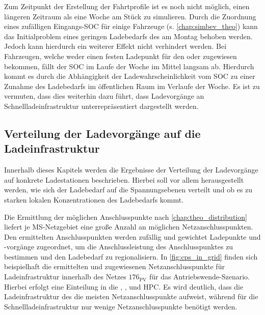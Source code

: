 

Zum Zeitpunkt der Erstellung der Fahrtprofile ist es noch nicht möglich, einen längeren Zeitraum als eine Woche am Stück zu simulieren.
Durch die Zuordnung eines zufälligen Eingangs-\gls{SOC} für einige Fahrzeuge (s. \autoref{chap:simbev_theo}) kann das Initialproblem eines geringen Ladebedarfs des \UC \Firmeparkplatz am Montag behoben werden.
Jedoch kann hierdurch ein weiterer Effekt nicht verhindert werden.
Bei Fahrzeugen, welche weder einen festen Ladepunkt für den \UC \zH oder \Firmeparkplatz zugewiesen bekommen, fällt der \gls{SOC} im Laufe der Woche im Mittel langsam ab.
Hierdurch kommt es durch die Abhängigkeit der Ladewahrscheinlichkeit vom \gls{SOC} zu einer Zunahme des Ladebedarfs im öffentlichen Raum im Verlaufe der Woche.
Es ist zu vermuten, dass dies weiterhin dazu führt, dass Ladevorgänge an Schnellladeinfrastruktur un­ter­re­prä­sen­tiert dargestellt werden.


\subsection{Verteilung der Ladevorgänge auf die Ladeinfrastruktur}\label{chap:distribute_demand_ev}

Innerhalb dieses Kapitels werden die Ergebnisse der Verteilung der Ladevorgänge auf konkrete Ladestationen beschrieben.
Hierbei soll vor allem herausgestellt werden, wie sich der Ladebedarf auf die Spannungsebenen verteilt und ob es zu starken lokalen Konzentrationen des Ladebedarfs kommt.\medskip

Die Ermittlung der möglichen Anschlusspunkte nach \autoref{chap:theo_distribution} liefert je \gls{MS}-Netzgebiet eine große Anzahl an möglichen Netzanschlusspunkten.
Den ermittelten Anschlusspunkten werden zufällig und gewichtet Ladepunkte und -vorgänge zugeordnet, um die Anschlussleistung des Anschlusspunktes zu bestimmen und den Ladebedarf zu regionalisiern.
In \autoref{fig:cps_in_grid} finden sich beispielhaft die ermittelten und zugewiesenen Netzanschlusspunkte für Ladeinfrastruktur innerhalb des Netzes \(176_{\text{PV}}\) für das Antriebswende-Szenario.
Hierbei erfolgt eine Einteilung in die \UCs \zHdot, \Firmeparkplatzdot, \oeffen und \gls{HPC}.
Es wird deutlich, dass die Ladeinfrastruktur des \UC \zH die meisten Netzanschlusspunkte aufweist, während für die Schnellladeinfrastruktur nur wenige Netzanschlusspunkte benötigt werden.



